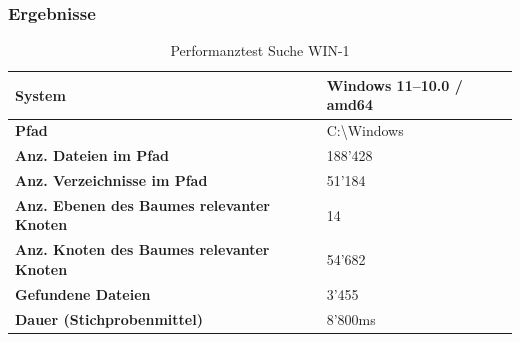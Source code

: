 \documentclass[a4paper,12pt]{report}
\begin{document}
    \newpage

    \subsubsection{Ergebnisse}
    \begin{table}[h!]
        \centering
        \setlength{\leftmargini}{0.8cm}
        \begin{tabular}{|p{7cm}|p{5cm}|}
            \hline
            \textbf{System}                                            & Windows 11--10.0 / amd64 \\ \hline
            \textbf{Pfad}                                              & C:\textbackslash Windows \\ \hline
            \textbf{Anz. Dateien im Pfad}                              & 188'428                  \\ \hline
            \textbf{Anz. Verzeichnisse im Pfad}                        & 51'184                   \\ \hline
            \textbf{Anz. Ebenen \newline des Baumes relevanter Knoten} & 14                       \\ \hline
            \textbf{Anz. Knoten \newline des Baumes relevanter Knoten} & 54'682                   \\ \hline
            \textbf{Gefundene Dateien}                                 & 3'455                    \\ \hline
            \textbf{Dauer (Stichprobenmittel)}                        & 8'800ms                  \\ \hline
        \end{tabular}
        \caption{Performanztest Suche WIN-1}\label{tab:perf-search-win-1}
    \end{table}
\end{document}

